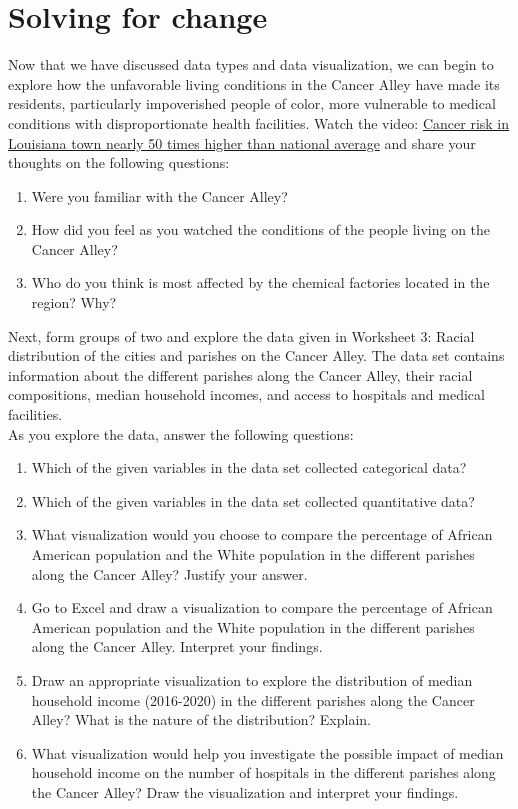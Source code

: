 \documentclass[a4paper, 11pt]{article}
\begin{document}
\section{Solving for change}
%
%
%
Now that we have discussed data types and data visualization, we can begin to explore how the unfavorable living conditions in the Cancer Alley have made its residents, particularly impoverished people of color, more vulnerable to medical conditions with disproportionate health facilities. Watch the video: \href{https://www.youtube.com/watch?v=MGNtMkFJkKg}{Cancer risk in Louisiana town nearly 50 times higher than national average} and share your thoughts on the following questions:
	\begin{enumerate}[label=\alph*), itemsep=0.5ex]
		\item 
		Were you familiar with the Cancer Alley?
		\item 
        		How did you feel as you watched the conditions of the people living on the Cancer Alley?
        		\item 
        		Who do you think is most affected by the chemical factories located in the region? Why?
        \end{enumerate}
         Next, form groups of two and explore the data given in Worksheet 3: Racial distribution of the cities and parishes on the Cancer Alley. The data set contains information about the different parishes along the Cancer Alley, their racial compositions, median household incomes, and access to hospitals and medical facilities.\\[1ex]
         As you explore the data, answer the following questions:
         \begin{enumerate}[label=\alph*), itemsep=0.5ex]
		\item 
      		Which of the given variables in the data set collected categorical data?
         	\item 
         	Which of the given variables in the data set collected quantitative data?
         	\item 
		What visualization would you choose to compare the percentage of African American population and the White population in the different parishes along the Cancer Alley? Justify your answer.
		\item 
		Go to Excel and draw a visualization to compare the percentage of African American population and the White population in the different parishes along the Cancer Alley. Interpret your findings.
		\item 
		Draw an appropriate visualization to explore the distribution of median household income (2016-2020) in the different parishes along the Cancer Alley? What is the nature of the distribution? Explain. 
		\item 
		What visualization would help you investigate the possible impact of median household income on the number of hospitals in the different parishes along the Cancer Alley? Draw the visualization and interpret your findings. 
	\end{enumerate}
%
%
%
\end{document}
